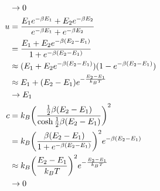 \documentclass[uplatex,dvipdfmx,a4paper,11pt]{jlreq}
\theoremstyle{definition}
\begin{document}
\begin{align}
    & \to 0                                                                                                                                       \\
  u & = \frac{E_1e^{-\beta E_1} + E_2e^{-\beta E_2}}{e^{-\beta E_1} + e^{-\beta E_2}}                                                             \\
    & = \frac{E_1 + E_2e^{-\beta (E_2 - E_1)}}{1 + e^{-\beta (E_2 - E_1)}}                                                                        \\
    & \approx (E_1 + E_2e^{-\beta (E_2 - E_1)})(1 - e^{-\beta (E_2 - E_1)})                                                                       \\
    & \approx E_1 + (E_2 - E_1)e^{- \frac{E_2 - E_1}{k_BT}}                                                                                       \\
    & \to E_1                                                                                                                                     \\
  c & = k_B\qty(\frac{\frac{1}{2}\beta(E_2 - E_1)}{\cosh\frac{1}{2}\beta(E_2 - E_1)})^2                                                           \\
    & = k_B\qty(\frac{\beta(E_2 - E_1)}{1 + e^{-\beta(E_2 - E_1)}})^2e^{-\beta(E_2 - E_1)}                                                        \\
    & \approx k_B\qty(\frac{E_2 - E_1}{k_BT})^2e^{-\frac{E_2 - E_1}{k_BT}}                                                                        \\
    & \to 0
\end{align}
\end{document}
